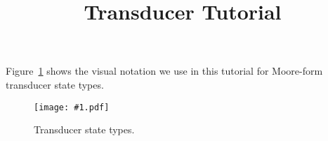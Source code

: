 \documentclass{article}
\newcommand{\figref}[1]{Figure~\ref{Figures.#1}}
\newcommand{\figlabel}[1]{\label{Figures.#1}}
\newcommand{\easyfig}[2]{
\begin{figure}
\texttt{[image: \#1.pdf]}
\caption{ \figlabel{#1} #2}
\end{figure}}
\begin{document}
\title{Transducer Tutorial}
\date{}
\maketitle

\figref{legend} shows the visual notation we use in this tutorial for Moore-form transducer state types.
\easyfig{legend}{Transducer state types.}
\end{document}
